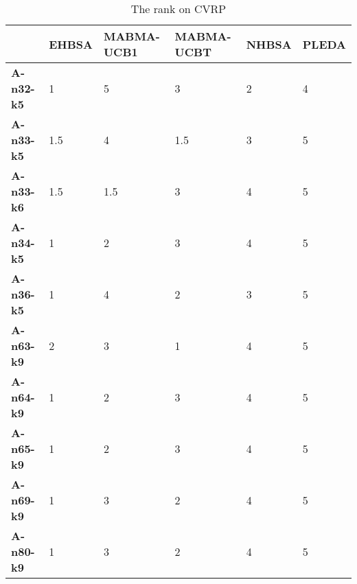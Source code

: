 \begin{table}[t]
    \centering
    \begin{tabular}{|l|l|l|l|l|l|}
    \hline
    \textbf{} & \textbf{EHBSA}       & \textbf{MABMA-UCB1} & \textbf{MABMA-UCBT} & \textbf{NHBSA} & \textbf{PLEDA} \\ \hline
    \textbf{A-n32-k5} & 1            & 5                  & 3              & 2           & 4         \\ \hline
    \textbf{A-n33-k5} & 1.5          & 4                  & 1.5            & 3           & 5         \\ \hline
    \textbf{A-n33-k6} & 1.5          & 1.5                & 3              & 4           & 5         \\ \hline
    \textbf{A-n34-k5} & 1            & 2                  & 3              & 4           & 5         \\ \hline
    \textbf{A-n36-k5} & 1            & 4                  & 2              & 3           & 5         \\ \hline
    \textbf{A-n63-k9} & 2            & 3                  & 1              & 4           & 5         \\ \hline
    \textbf{A-n64-k9} & 1            & 2                  & 3              & 4           & 5         \\ \hline
    \textbf{A-n65-k9} & 1            & 2                  & 3              & 4           & 5         \\ \hline
    \textbf{A-n69-k9} & 1            & 3                  & 2              & 4           & 5         \\ \hline
    \textbf{A-n80-k9} & 1            & 3                  & 2              & 4           & 5         \\ \hline
    \end{tabular} 
    \caption{The rank on CVRP}
    \label{tb:mabma_result}
\end{table}

